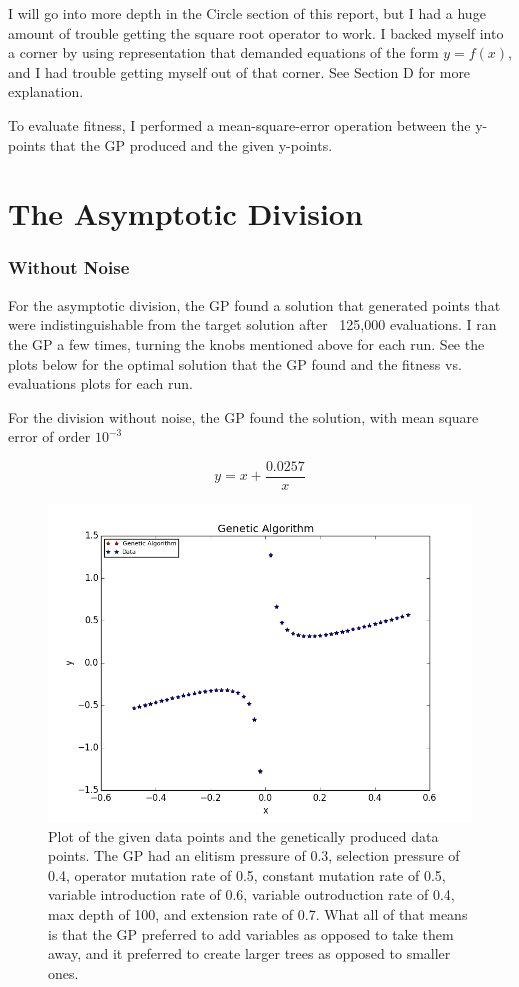 \documentclass[11pt,amsmath,amssymb]{revtex4}
\begin{document}
I will go into more depth in the Circle section of this report, but I had a huge amount of trouble getting the square root operator to work. I backed myself into a corner by using representation that demanded equations of the form $y=f(x)$, and I had trouble getting myself out of that corner. See Section D for more explanation.

To evaluate fitness, I performed a mean-square-error operation between the y-points that the GP produced and the given y-points.

\section{The Asymptotic Division}
\subsubsection{Without Noise}
For the asymptotic division, the GP found a solution that generated points that were indistinguishable from the target solution after ~125,000 evaluations. I ran the GP a few times, turning the knobs mentioned above for each run. See the plots below for the optimal solution that the GP found and the fitness vs. evaluations plots for each run.

For the division without noise, the GP found the solution, with mean square error of order $10^{-3}$

\begin{equation}
y = x+\frac{0.0257}{x}
\end{equation}

\begin{figure}[H]
\center
\includegraphics[scale=0.5]{Div_No_Noise.png}
\caption{Plot of the given data points and the genetically produced data points. The GP had an elitism pressure of 0.3, selection pressure of 0.4, operator mutation rate of 0.5, constant mutation rate of 0.5, variable introduction rate of 0.6, variable outroduction rate of 0.4, max depth of 100, and extension rate of 0.7. What all of that means is that the GP preferred to add variables as opposed to take them away, and it preferred to create larger trees as opposed to smaller ones.}
\label{q1}
\end{figure}
\end{document}
